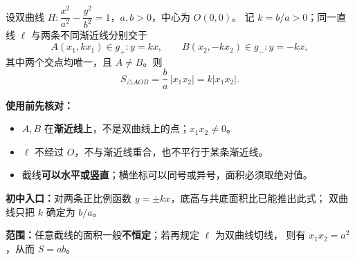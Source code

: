 \begin{statementbox}
设双曲线 $H:\dfrac{x^2}{a^2}-\dfrac{y^2}{b^2}=1$，$a,b>0$，中心为 $O(0,0)$。
记 $k=b/a>0$；同一直线 $\ell$ 与两条不同渐近线分别交于
\[
 A(x_1,kx_1)\in g_+:y=kx,\qquad
 B(x_2,-kx_2)\in g_-:y=-kx,
\]
其中两个交点均唯一，且 $A\ne B$。则
\[
\boxed{S_{\triangle AOB}=\frac ba\,|x_1x_2|=k|x_1x_2|}.
\]
\begin{center}\end{center}
\textbf{使用前先核对：}
\begin{itemize}[leftmargin=*,itemsep=.25em]
\item $A,B$ 在\textbf{渐近线}上，不是双曲线上的点；$x_1x_2\ne0$。
\item $\ell$ 不经过 $O$，不与渐近线重合，也不平行于某条渐近线。
\item 截线\textbf{可以水平或竖直}；横坐标可以同号或异号，面积必须取绝对值。
\end{itemize}
\textbf{初中入口：}对两条正比例函数 $y=\pm kx$，底高与共底面积比已能推出此式；
双曲线只把 $k$ 确定为 $b/a$。

\textbf{范围：}任意截线的面积一般\textbf{不恒定}；若再规定 $\ell$ 为双曲线切线，
则有 $x_1x_2=a^2$，从而 $S=ab$。
\end{statementbox}
